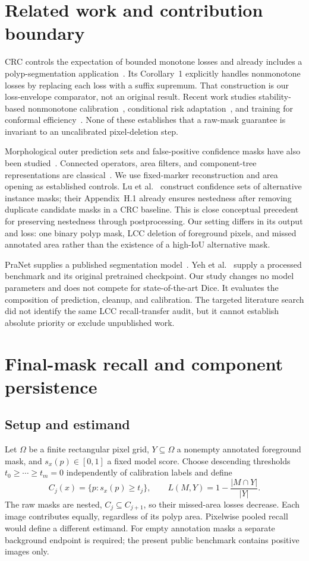 \documentclass[11pt,a4paper]{article}
\begin{document}
\section{Related work and contribution boundary}
CRC controls the expectation of bounded monotone losses and already includes a polyp-segmentation application~\cite{crc}. Its Corollary~1 explicitly handles nonmonotone losses by replacing each loss with a suffix supremum. That construction is our loss-envelope comparator, not an original result. Recent work studies stability-based nonmonotone calibration~\cite{nonmono}, conditional risk adaptation~\cite{cra}, and training for conformal efficiency~\cite{crt}. None of these establishes that a raw-mask guarantee is invariant to an uncalibrated pixel-deletion step.

Morphological outer prediction sets and false-positive confidence masks have also been studied~\cite{morph,fp}. Connected operators, area filters, and component-tree representations are classical~\cite{connected}. We use fixed-marker reconstruction and area opening as established controls. Lu et al.~\cite{instance} construct confidence sets of alternative instance masks; their Appendix~H.1 already ensures nestedness after removing duplicate candidate masks in a CRC baseline. This is close conceptual precedent for preserving nestedness through postprocessing. Our setting differs in its output and loss: one binary polyp mask, LCC deletion of foreground pixels, and missed annotated area rather than the existence of a high-IoU alternative mask.

PraNet supplies a published segmentation model~\cite{pranet}. Yeh et al.~\cite{crt} supply a processed benchmark and its original pretrained checkpoint. Our study changes no model parameters and does not compete for state-of-the-art Dice. It evaluates the composition of prediction, cleanup, and calibration. The targeted literature search did not identify the same LCC recall-transfer audit, but it cannot establish absolute priority or exclude unpublished work.

\section{Final-mask recall and component persistence}
\subsection{Setup and estimand}
Let $\Omega$ be a finite rectangular pixel grid, $Y\subseteq\Omega$ a nonempty annotated foreground mask, and $s_x(p)\in[0,1]$ a fixed model score. Choose descending thresholds $t_0\ge\cdots\ge t_m=0$ independently of calibration labels and define
\begin{equation}
 C_j(x)=\{p:s_x(p)\ge t_j\},\qquad
 L(M,Y)=1-\frac{|M\cap Y|}{|Y|}.
 \label{eq:loss}
\end{equation}
The raw masks are nested, $C_j\subseteq C_{j+1}$, so their missed-area losses decrease. Each image contributes equally, regardless of its polyp area. Pixelwise pooled recall would define a different estimand. For empty annotation masks a separate background endpoint is required; the present public benchmark contains positive images only.
\end{document}
